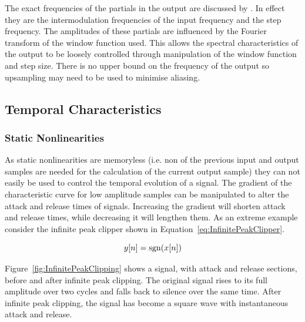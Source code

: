 			The exact frequencies of the partials in the output are discussed by \citet{kim2014shorttime}. In
			effect they are the intermodulation frequencies of the input frequency and the step frequency. The
			amplitudes of these partials are influenced by the Fourier transform of the window function used.
			This allows the spectral characteristics of the output to be loosely controlled through
			manipulation of the window function and step size. There is no upper bound on the frequency of the
			output so upsampling may need to be used to minimise aliasing.

	\subsection{Temporal Characteristics}
	\label{sec:ExcitationEvaluation-Comparison-TemporalCharacteristics}
		\subsubsection*{Static Nonlinearities}
			As static nonlinearities are memoryless (i.e. non of the previous input and output samples are
			needed for the calculation of the current output sample) they can not easily be used to control the
			temporal evolution of a signal. The gradient of the characteristic curve for low amplitude samples
			can be manipulated to alter the attack and release times of signals. Increasing the gradient will
			shorten attack and release times, while decreasing it will lengthen them. As an extreme example
			consider the infinite peak clipper shown in Equation~\ref{eq:InfinitePeakClipper}.

			\begin{equation}
				y[n] = \operatorname{sgn}(x[n])
				\label{eq:InfinitePeakClipper}
			\end{equation}
			
			Figure~\ref{fig:InfinitePeakClipping} shows a signal, with attack and release sections, before and
			after infinite peak clipping. The original signal rises to its full amplitude over two cycles and
			falls back to silence over the same time. After infinite peak clipping, the signal has become a
			square wave with instantaneous attack and release.

